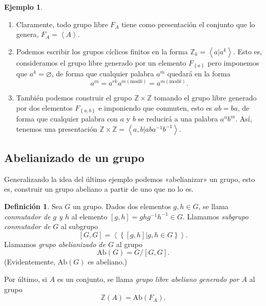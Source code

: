 \documentclass[12pt,a4paper]{book}
\theoremstyle{definition} \newtheorem{defn}[thm]{Definición}
\theoremstyle{definition} \newtheorem{ejemplo}[thm]{Ejemplo}
\theoremstyle{definition} \newtheorem{ejercicio}[thm]{Ejercicio}
\theoremstyle{remark} \newtheorem*{obs}{Observación}
\def\ZZ{\mathbb{Z}}
\def\ab{\mathrm{Ab}}
\newcommand\gen[1]{\left\langle #1 \right\rangle}
\begin{document}
 \begin{ejemplo} \leavevmode
   \begin{enumerate}
     \item Claramente, todo grupo libre $F_A$ tiene como presentación el conjunto que lo genera, $F_A=\gen{A}$.

     \item Podemos escribir los grupos cíclicos finitos en la forma $\ZZ_k=\gen{a|a^k}$. Esto es, consideramos el grupo libre generado por un elemento $F_{\left\{ a \right\}}$ pero imponemos que $a^k=\varnothing$, de forma que cualquier palabra $a^m$ quedará en la forma 
   \begin{equation*}
     a^m=a^{rk}a^{m (\mathrm{mod} k)}=a^{m (\mathrm{mod} k)}.
   \end{equation*}

 \item También podemos construir el grupo $\ZZ\times \ZZ$ tomando el grupo libre generado por dos elementos $F_{ \left\{ a,b \right\}}$ e imponiendo que conmuten, esto es $ab=ba$, de forma que cualquier palabra con $a$ y $b$ se reducirá a una palabra $a^nb^m$. Así, tenemos una presentación $\ZZ \times \ZZ =\gen{a,b|aba^{-1}b^{-1}}$.
   \end{enumerate}
 \end{ejemplo}

 \subsection{Abelianizado de un grupo}

 Generalizando la idea del último ejemplo podemos «abelianizar» un grupo, esto es, construir un grupo abeliano a partir de uno que no lo es. 
 \begin{defn}
   Sea $G$ un grupo. Dados dos elementos $g,h\in G$, se llama \emph{conmutador de $g$ y $h$} al elemento $[g,h]=ghg^{-1}h^{-1}\in G$. Llamamos \emph{subgrupo conmutador de $G$} al subgrupo $$[G,G]=\gen{\left\{ [g,h]| g,h \in G \right\}}.$$ Llamamos \emph{grupo abelianizado de $G$} al grupo
   \begin{equation*}
     \ab(G)=G/[G,G].
   \end{equation*}
   (Evidentemente, $\ab(G)$ es abeliano.)
   
   Por último, si $A$ es un conjunto, se llama \emph{grupo libre abeliano generado por $A$} al grupo
   \begin{equation*}
     \ZZ(A)=\ab(F_A).
   \end{equation*}
 \end{defn}
 
\end{document}
